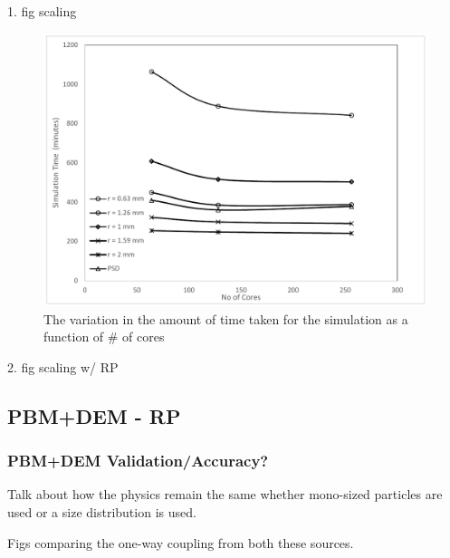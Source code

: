 \documentclass[preprint,11pt,authoryear]{elsarticle}
\begin{document}
	    \par 1. fig scaling 
	      \begin{figure}[H]
	      \centering
	      \includegraphics[scale=0.7]{rslts_DEM_timing_plots.pdf}
	      \caption{The variation in the amount of time taken for the simulation as a function of \# of cores}
	      \label{fig:rslts_DEM_timing_studies}
	      \end{figure}
	    \par 2. fig scaling w/ RP  
	      
	 
	    
	  \subsection{PBM+DEM - RP} 
	    \subsubsection{PBM+DEM Validation/Accuracy?}
	   	\par Talk about how the physics remain the same whether mono-sized particles are used or a size distribution is used.
	   \par Figs comparing the one-way coupling from both these sources.
	    
\end{document}
